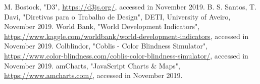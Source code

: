 \documentclass[conference]{IEEEtran}
\begin{document}






\begin{thebibliography}{00}
 M. Bostock, "D3", \url{https://d3js.org/}, accessed in November 2019.
 B. S. Santos, T. Davi, "Diretivas para o Trabalho de Design", DETI, University of Aveiro, November 2019.
 World Bank, "World Development Indicators", \url{https://www.kaggle.com/worldbank/world-development-indicators}, accessed in November 2019.
 Colblindor, "Coblis - Color Blindness Simulator", \url{https://www.color-blindness.com/coblis-color-blindness-simulator/}, accessed in November 2019.
 amCharts, "JavaScript Charts \& Maps", \url{https://www.amcharts.com/}, accessed in November 2019.
\end{thebibliography}
\vspace{12pt}
\end{document}
